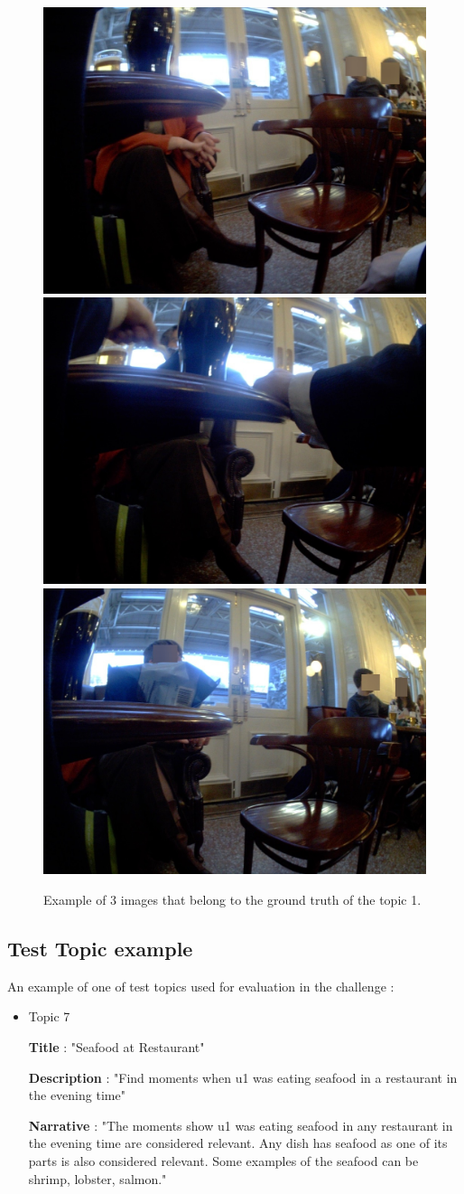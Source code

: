     \begin{figure}[H]
        \centering
        \captionsetup{justification=centering}
        \includegraphics[width=.3\linewidth]{Sections/5ImageClef/images/example.jpg}
        \includegraphics[width=.3\linewidth]{Sections/5ImageClef/images/example1.jpg}
        \includegraphics[width=.3\linewidth]{Sections/5ImageClef/images/example3.jpg}
        \caption[Ground truth images]{Example of 3 images that belong to the ground truth of the topic 1.}
    \end{figure}      

    \newpage


    \subsection{Test Topic example}

    An example of one of test topics used for evaluation in the challenge :

        \begin{itemize}

        \item Topic 7
        

        \textbf{Title} : "Seafood at Restaurant"

        \textbf{Description} : "Find moments when u1 was eating seafood in a restaurant in the evening time"

        \textbf{Narrative} : "The moments show u1 was eating seafood in any restaurant in the evening time are considered relevant. Any dish has seafood as one of its parts is also considered relevant. Some examples of the seafood can be shrimp, lobster, salmon."

        \end{itemize}
     
